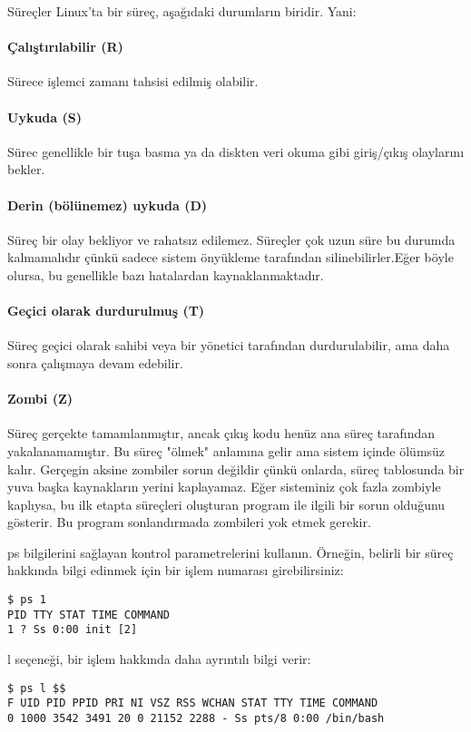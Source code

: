 \begin{section}{Süreçler}
Linux'ta bir süreç, aşağıdaki durumların biridir. Yani:
\paragraph{Çalıştırılabilir (R)}{Sürece işlemci zamanı tahsisi edilmiş olabilir.}
\paragraph{Uykuda (S)}{Sürec genellikle bir tuşa basma  ya da diskten veri okuma gibi  giriş/çıkış olaylarını bekler.}
\paragraph{Derin (bölünemez) uykuda (D)}{Süreç bir olay bekliyor ve rahatsız edilemez. Süreçler çok uzun süre bu durumda kalmamalıdır çünkü sadece sistem önyükleme tarafından silinebilirler.Eğer böyle olursa, bu genellikle bazı hatalardan kaynaklanmaktadır.}
\paragraph{Geçici olarak durdurulmuş (T)}{Süreç geçici olarak sahibi veya bir yönetici tarafından durdurulabilir, ama daha sonra çalışmaya devam edebilir.}
\paragraph{Zombi (Z)}{Süreç gerçekte tamamlanmıştır, ancak çıkış kodu henüz ana süreç tarafından yakalanamamıştır. Bu süreç "ölmek" anlamına gelir ama sistem içinde ölümsüz kalır. Gerçegin aksine zombiler sorun değildir çünkü onlarda, süreç tablosunda bir yuva başka kaynakların yerini kaplayamaz. Eğer sisteminiz çok fazla zombiyle kaplıysa, bu ilk etapta süreçleri oluşturan program ile ilgili bir sorun olduğunu gösterir. Bu program sonlandırmada zombileri yok etmek gerekir.
}

ps bilgilerini sağlayan kontrol parametrelerini kullanın. Örneğin, belirli bir süreç hakkında bilgi edinmek için bir işlem numarası girebilirsiniz:
\begin{verbatim}
$ ps 1
PID TTY STAT TIME COMMAND
1 ? Ss 0:00 init [2]
\end{verbatim}

l seçeneği, bir işlem hakkında daha ayrıntılı bilgi verir:
\begin{verbatim}
$ ps l $$
F UID PID PPID PRI NI VSZ RSS WCHAN STAT TTY TIME COMMAND
0 1000 3542 3491 20 0 21152 2288 - Ss pts/8 0:00 /bin/bash
\end{verbatim}


\end{section}

